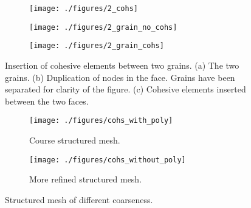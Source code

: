 \documentclass[grain_boundary_law.tex]{subfiles}
\begin{document}
\begin{figure}
\centering
\begin{subfigure}[b]{.5\linewidth}
  \centering
  \texttt{[image: ./figures/2\_cohs]}
  \caption{}
  \label{fig:cohs_2_a}
\end{subfigure}%
\hspace{-10mm}
\begin{subfigure}[b]{.5\linewidth}
  \centering
  \texttt{[image: ./figures/2\_grain\_no\_cohs]}
  \caption{}
  \label{fig:cohs_2_b}
\end{subfigure}%
\hspace{-10mm}
\begin{subfigure}[b]{.5\linewidth}
  \centering
  \texttt{[image: ./figures/2\_grain\_cohs]}
  \caption{}
  \label{fig:cohs_2_c}
\end{subfigure}
\caption{Insertion of cohesive elements between two grains. (a) The two grains. (b) Duplication of nodes in the face. Grains have been separated for clarity of the figure. (c) Cohesive elements inserted between the two faces. }
\label{fig:cohs_2}
\end{figure}



\begin{figure}
\centering
\begin{subfigure}[b]{.5\textwidth}
  \centering
  \texttt{[image: ./figures/cohs\_with\_poly]}
  \caption{Course structured mesh.}
  \label{fig:cohs_large_a}
\end{subfigure}%
\begin{subfigure}[b]{.5\textwidth}
  \centering
  \texttt{[image: ./figures/cohs\_without\_poly]}
  \caption{More refined structured mesh.}
  \label{fig:cohs_large_b}
\end{subfigure}
\caption{Structured mesh of different coarseness.}
\label{fig:cohs_large}
\end{figure}
\end{document}
